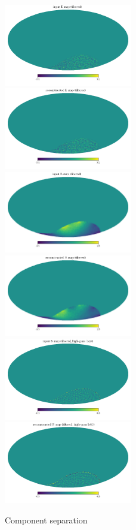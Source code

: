 \documentclass[12pt, a4paper]{ctexart} %
\begin{document}
\begin{figure}
  \includegraphics[width=0.5\textwidth]{original_Emap.png}%
  \includegraphics[width=0.5\textwidth]{reconstructed_Emap.png}  
  \includegraphics[width=0.5\textwidth]{original_Bmap.png}%
  \includegraphics[width=0.5\textwidth]{reconstructed_Bmap.png}  
  \includegraphics[width=0.5\textwidth]{original_Bmap_l50.png}%
  \includegraphics[width=0.5\textwidth]{reconstructed_Bmap_l50.png}
  \caption{Component separation \label{fig:compsep}}
\end{figure}
\end{document}
